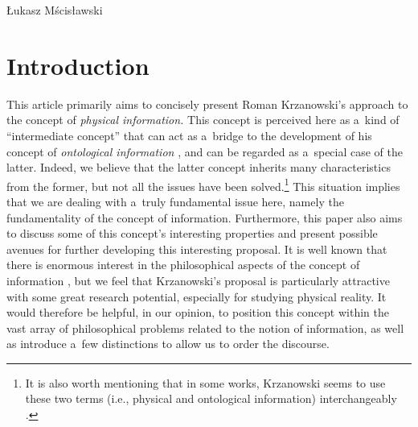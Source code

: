 \begin{artengenv}{Łukasz Mścisławski}
\section*{Introduction}
\lettrine[loversize=0.13,lines=2,lraise=-0.03,nindent=0em,findent=0.2pt]%
{T}{}his article primarily aims to concisely present Roman Krzanowski's approach to the concept of \textit{physical information.} This concept is perceived here as a~kind of ``intermediate concept'' that can act as a~bridge to the development of his concept of \textit{ontological information}
\parencites[cf.][]{krzanowski_does_2020}[][]{krzanowski_what_2020}[][]{krzanowski_why_2020}[and especially][]{krzanowski_ontological_2022},%
and can be regarded as a~special case of the latter. Indeed, we believe that the latter concept inherits many characteristics from the former, but not all the issues have been solved.\footnote{It is also worth mentioning that in some works, Krzanowski seems to use these two terms (i.e., physical and ontological information) interchangeably
\parencite[cf.][]{krzanowski_what_2020}.%
} This situation implies that we are dealing with a~truly fundamental issue here, namely the fundamentality of the concept of information. Furthermore, this paper also aims to discuss some of this concept's interesting properties and present possible avenues for further developing this interesting proposal. It is well known that there is enormous interest in the philosophical aspects of the concept of information 
\parencites[e.g.,][]{adriaans_philosophy_2008}[][]{burgin_theory_2010}[][]{floridi_philosophy_2011}[][]{dodig_crnkovic_philosophy_2019}, %
 but we feel that Krzanowski's proposal is particularly attractive with some great research potential, especially for studying physical reality. It would %
therefore be helpful, in our opinion, to position this concept within the vast array of philosophical problems related to the notion of information, as well as introduce a~few distinctions to allow us to order the discourse.


\end{artengenv}

